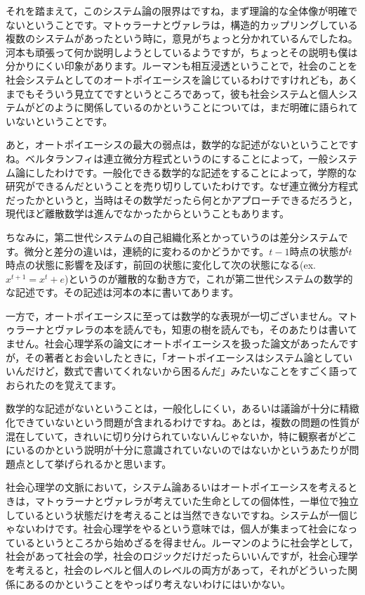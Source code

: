 \documentclass{ltjsbook}
\begin{document}
それを踏まえて，このシステム論の限界はですね，まず理論的な全体像が明確でないということです。マトゥラーナとヴァレラは，構造的カップリングしている複数のシステムがあったという時に，意見がちょっと分かれているんでしたね。河本も頑張って何か説明しようとしているようですが，ちょっとその説明も僕は分かりにくい印象があります。ルーマンも相互浸透ということで，社会のことを社会システムとしてのオートポイエーシスを論じているわけですけれども，あくまでもそういう見立てですというところであって，彼も社会システムと個人システムがどのように関係しているのかということについては，まだ明確に語られていないということです。

あと，オートポイエーシスの最大の弱点は，数学的な記述がないということですね。ベルタランフィは連立微分方程式というのにすることによって，一般システム論にしたわけです。一般化できる数学的な記述をすることによって，学際的な研究ができるんだということを売り切りしていたわけです。なぜ連立微分方程式だったかというと，当時はその数学だったら何とかアプローチできるだろうと，現代ほど離散数学は進んでなかったからということもあります。

ちなみに，第二世代システムの自己組織化系とかっていうのは差分システムです。微分と差分の違いは，連続的に変わるのかどうかです。$t-1$時点の状態が$t$時点の状態に影響を及ぼす，前回の状態に変化して次の状態になる(ex.$x^{t+1}=x^t+e$)というのが離散的な動き方で，これが第二世代システムの数学的な記述です。その記述は河本の本\parencite{KawamotoHideo}に書いてあります。

一方で，オートポイエーシスに至っては数学的な表現が一切ございません。マトゥラーナとヴァレラの本を読んでも，知恵の樹を読んでも，そのあたりは書いてません。社会心理学系の論文にオートポイエーシスを扱った論文\parencite{NomuraTatsuya}があったんですが，その著者とお会いしたときに，「オートポイエーシスはシステム論としていいんだけど，数式で書いてくれないから困るんだ」みたいなことをすごく語っておられたのを覚えてます。

数学的な記述がないということは，一般化しにくい，あるいは議論が十分に精緻化できていないという問題が含まれるわけですね。あとは，複数の問題の性質が混在していて，きれいに切り分けられていないんじゃないか，特に観察者がどこにいるのかという説明が十分に意識されていないのではないかというあたりが問題点として挙げられるかと思います。

社会心理学の文脈において，システム論あるいはオートポイエーシスを考えるときは，マトゥラーナとヴァレラが考えていた生命としての個体性，一単位で独立しているという状態だけを考えることは当然できないですね。システムが一個じゃないわけです。社会心理学をやるという意味では，個人が集まって社会になっているというところから始めざるを得ません。ルーマンのように社会学として，社会があって社会の学，社会のロジックだけだったらいいんですが，社会心理学を考えると，社会のレベルと個人のレベルの両方があって，それがどういった関係にあるのかということをやっぱり考えないわけにはいかない。
\end{document}

